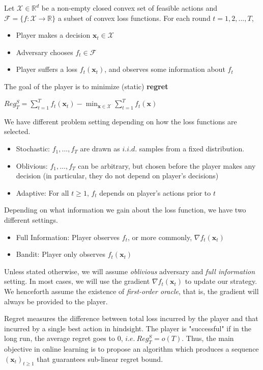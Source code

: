\documentclass[12pt, a4paper]{report}
\begin{document}
\begin{defn}
Let $\mathcal{X} \in \mathbb{R}^d$ be a non-empty closed convex set of feasible actions and $\mathcal{F} = \{f : \mathcal{X} \rightarrow \mathbb{R} \}$ a subset of convex loss functions. For each round $t=1,2,...,T$, 
\begin{itemize}
    \item Player makes a decision $\mathbf{x}_t \in \mathcal{X}$
    \item Adversary chooses $f_t \in \mathcal{F}$
    \item Player suffers a loss $f_t(\mathbf{x}_t)$, and observes some information about $f_t$
\end{itemize}
The goal of the player is to minimize (static) \textbf{regret}
\begin{center}
    $\displaystyle Reg_T^{S} = \sum_{t=1}^{T} f_t(\mathbf{x}_t) - \min_{\mathbf{x} \in \mathcal{X}} \sum_{t=1}^{T} f_t(\mathbf{x})$
\end{center}
\end{defn}
We have different problem setting depending on how the loss functions are selected.
\begin{itemize}
    \item Stochastic: $f_1, \dots, f_T$ are drawn as $i.i.d.$ samples from a fixed distribution.
    \item Oblivious: $f_1, \dots, f_T$ can be arbitrary, but chosen before the player makes any decision (in particular, they do not depend on player's decisions)
    \item Adaptive: For all $t \geq 1$, $f_t$ depends on player's actions prior to $t$ 
\end{itemize}
Depending on what information we gain about the loss function, we have two different settings.
\begin{itemize}
    \item Full Information: Player observes $f_t$, or more commonly, $\nabla f_t(\mathbf{x}_t)$
    \item Bandit: Player only observes $f_t(\mathbf{x}_t)$
\end{itemize}
Unless stated otherwise, we will assume \textit{oblivious} adversary and \textit{full information} setting. In most cases, we will use the gradient $\nabla f_t(\mathbf{x}_t)$ to update our strategy. We henceforth assume the existence of \textit{first-order oracle}, that is, the gradient will always be provided to the player.

Regret measures the difference between total loss incurred by the player and that incurred by a single best action in hindsight. The player is "successful" if in the long run, the average regret goes to 0, $i.e.\ Reg_{T}^S = o(T)$.
Thus, the main objective in online learning is to propose an algorithm which produces a sequence $(\mathbf{x}_t)_{t \geq 1}$ that guarantees sub-linear regret bound.
\end{document}
